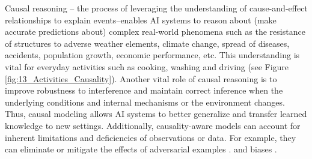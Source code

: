 \documentclass[10pt,journal,compsoc]{IEEEtran}
\begin{document}
	Causal reasoning – the process of leveraging the understanding of cause-and-effect relationships to explain events–enables AI systems to reason about (make accurate predictions about) complex real-world phenomena such as the resistance of structures to adverse weather elements, climate change, spread of diseases, accidents, population growth, economic performance, etc. This understanding is vital for everyday activities such as cooking, washing and driving (see Figure \ref{fig:13_Activities_Causality}).  Another vital role of causal reasoning is to improve robustness to interference and maintain correct inference when the underlying conditions and internal mechanisms or the environment changes. Thus, causal modeling allows AI systems to better generalize and transfer learned knowledge to new settings. Additionally, causality-aware models can account for inherent limitations and deficiencies of observations or data. For example, they can eliminate or mitigate the effects of adversarial examples \cite{zhang2021causaladv,ren2022towards,debbi2024causadv}. and biases \cite{vlontzos2022review}. 
	
	
	
\end{document}
